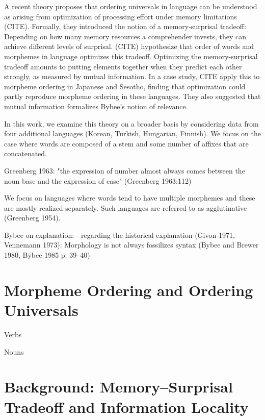 \documentclass[11pt,letterpaper]{article}
\begin{document}
A recent theory proposes that ordering universals in language can be understood as arising from optimization of processing effort under memory limitations (CITE).
Formally, they introduced the notion of a memory-surprisal tradeoff: Depending on how many memory resources a comprehender invests, they can achieve different levels of surprisal.
(CITE) hypothesize that order of words and morphemes in language optimizes this tradeoff.
Optimizing the memory-surprisal tradeoff amounts to putting elements together when they predict each other strongly, as measured by mutual information.
In a case study, CITE apply this to morpheme ordering in Japanese and Sesotho, finding that optimization could partly reproduce morpheme ordering in these languages.
They also suggested that mutual information formalizes Bybee's notion of relevance.


In this work, we examine this theory on a broader basis by considering data from four additional languages (Korean, Turkish, Hungarian, Finnish).
We focus on the case where words are composed of a stem and some number of affixes that are concatenated.


Greenberg 1963:  "the expression of number almost always comes between the noun base and the expression of case" (Greenberg 1963:112)



We focus on languages where words tend to have multiple morphemes and these are mostly realized separately. Such languages are referred to as agglutinative (Greenberg 1954).


Bybee on explanation:
- regarding the historical explanation (Givon 1971, Vennemann 1973):
Morphology is not always fossilizes syntax (Bybee and Brewer 1980, Bybee 1985 p. 39--40)


\section{Morpheme Ordering and Ordering Universals}

Verbs

Nouns


\section{Background: Memory--Surprisal Tradeoff and Information Locality}
\end{document}
